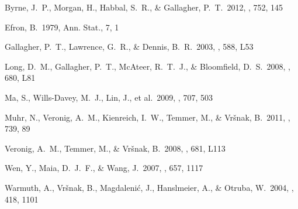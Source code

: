 \documentclass[structabstract]{aa}
\newcommand{\stat}{Ann. Stat.}
\begin{document}
\begin{thebibliography}{}

Byrne, J.~P., Morgan, H., Habbal, S.~R., \& Gallagher, P.~T.\ 2012, \apj, 752, 145 

Efron, B.\ 1979, \stat, 7, 1

Gallagher, P.~T., Lawrence, G.~R., \& Dennis, B.~R.\ 2003, \apjl, 588, L53 

Long, D.~M., Gallagher, P.~T., McAteer, R.~T.~J., \& Bloomfield, D.~S.\ 2008, \apjl, 680, L81 

Ma, S., Wills-Davey, M.~J., Lin, J., et al.\ 2009, \apj, 707, 503 

Muhr, N., Veronig, A.~M., Kienreich, I.~W., Temmer, M., \& Vr{\v s}nak, B.\ 2011, \apj, 739, 89 

Veronig, A.~M., Temmer, M., \& Vr{\v s}nak, B.\ 2008, \apjl, 681, L113 

Wen, Y., Maia, D.~J.~F., \& Wang, J.\ 2007, \apj, 657, 1117 

Warmuth, A., Vr{\v s}nak, B., Magdaleni{\'c}, J., Hanslmeier, A., \& Otruba, W.\ 2004, \aap, 418, 1101 


\end{thebibliography}

%
%  
\end{document}

